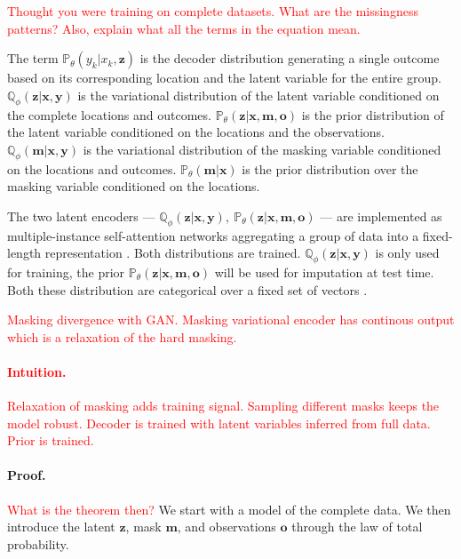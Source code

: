 \documentclass[a4paper,12pt,twoside,openright]{report}
\newcommand{\crit}[1]{\textcolor{red}{#1}}
\begin{document}
\crit{Thought you were training on complete datasets. What are the missingness patterns? Also, explain what all the terms in the equation mean.}

The term $\mathbb{P}_\theta (y_k | x_k, \mathbf{z})$ is the decoder distribution generating a single outcome based on its corresponding location and the latent variable for the entire group. $\mathbb{Q}_\phi (\mathbf{z} | \mathbf{x}, \mathbf{y})$ is the variational distribution of the latent variable conditioned on the complete locations and outcomes. $\mathbb{P}_\theta (\mathbf{z} | \mathbf{x}, \mathbf{m}, \mathbf{o})$ is the prior distribution of the latent variable conditioned on the locations and the observations. $\mathbb{Q}_\phi (\mathbf{m} | \mathbf{x}, \mathbf{y})$ is the variational distribution of the masking variable conditioned on the locations and outcomes. $\mathbb{P}_\theta (\mathbf{m} | \mathbf{x})$ is the prior distribution over the masking variable conditioned on the locations.

The two latent encoders --- $\mathbb{Q}_\phi (\mathbf{z} | \mathbf{x}, \mathbf{y}), ~ \mathbb{P}_\theta (\mathbf{z} | \mathbf{x}, \mathbf{m}, \mathbf{o})$ --- are implemented as multiple-instance self-attention networks aggregating a group of data into a fixed-length representation \parencite{ilseAttentionbasedDeepMultiple2018}. Both distributions are trained. $\mathbb{Q}_\phi (\mathbf{z} | \mathbf{x}, \mathbf{y})$ is only used for training, the prior $\mathbb{P}_\theta (\mathbf{z} | \mathbf{x}, \mathbf{m}, \mathbf{o})$ will be used for imputation at test time. Both these distribution are categorical over a fixed set of vectors \parencite{vandenoordNeuralDiscreteRepresentation2017}.

\crit{Masking divergence with GAN. Masking variational encoder has continous output which is a relaxation of the hard masking.}

\crit{\paragraph{Intuition.} Relaxation of masking adds training signal. Sampling different masks keeps the model robust. Decoder is trained with latent variables inferred from full data. Prior is trained.}

\paragraph{Proof.} \crit{What is the theorem then?} We start with a model of the complete data. We then introduce the latent $\mathbf{z}$, mask $\mathbf{m}$, and observations $\mathbf{o}$ through the law of total probability.
\end{document}
